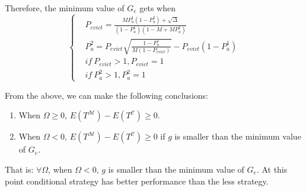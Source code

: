 Therefore, the minimum value of $G_e$ gets when
\begin{equation}
\left\{
\begin{split}
&P_{evict} = \frac{MP_{a}^{\mathfrak{1}}(1-P_{a}^{\mathfrak{2}})+\sqrt{\Delta}}{(1-P_{a}^{\mathfrak{1}})(1-M+MP_{a}^{\mathfrak{1}})} \\
&P_{a}^{\mathfrak{2}} = P_{evict}\sqrt{\frac{1-P_{a}^{\mathfrak{1}}}{M(1-P_{evict})}}-P_{evict}(1-P_{a}^{\mathfrak{1}}) \\
& if\  P_{evict} >1, P_{evict} = 1 \\
& if\  P_{a}^{\mathfrak{2}} >1, P_{a}^{\mathfrak{2}} = 1
\end{split}
\right.
\end{equation}

From the above, we can make the following conclusions:
\begin{enumerate}
  \item
  When $\Omega \geq 0$, $E(T^{\mathcal{M}}) - E(T^{\mathcal{C}}) \geq 0$.
  \item
  When $\Omega < 0$, $E(T^{\mathcal{M}}) - E(T^{\mathcal{C}}) \geq 0$ if $g$ is smaller than the minimum value of $G_e$.
\end{enumerate}
That is:
$\forall \Omega$, when  $\Omega < 0$, $g$ is smaller than the minimum value of $G_e$.
At this point conditional {\vwarm} strategy has better performance than the less {\vwarm} strategy.





